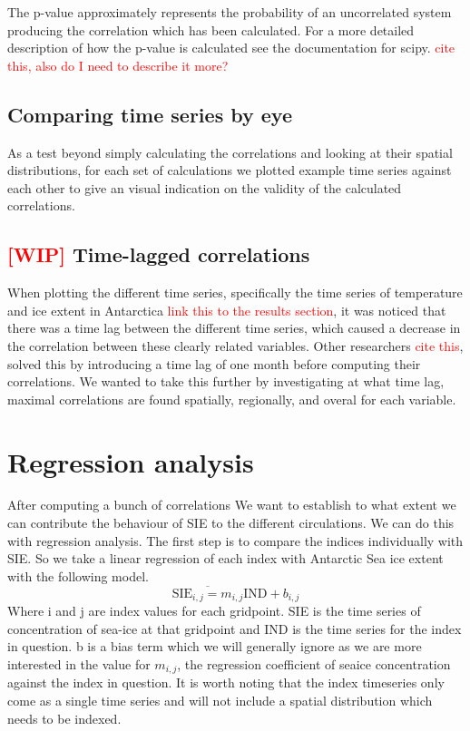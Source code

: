 \documentclass[../main.tex]{subfiles}
\begin{document}
The p-value approximately represents the probability of an uncorrelated system producing the correlation which has been calculated. For a more detailed description of how the p-value is calculated see the documentation for scipy. \textcolor{red}{cite this, also do I need to describe it more?}


\subsection{Comparing time series by eye}
As a test beyond simply calculating the correlations and looking at their spatial distributions, for each set of calculations we plotted example time series against each other to give an visual indication on the validity of the calculated correlations.


\subsection{\textcolor{red}{[WIP]} Time-lagged correlations}
When plotting the different time series, specifically the time series of temperature and ice extent in Antarctica \textcolor{red}{link this to the results section}, it was noticed that there was a time lag between the different time series, which caused a decrease in the correlation between these clearly related variables. Other researchers \textcolor{red}{cite this}, solved this by introducing a time lag of one month before computing their correlations. We wanted to take this further by investigating at what time lag, maximal correlations are found spatially, regionally, and overal for each variable.


\section{Regression analysis}
After computing a bunch of correlations We want to establish to what extent we can contribute the behaviour of SIE to the different circulations. We can do this with regression analysis. The first step is to compare the indices individually with SIE. So we take a linear regression of each index with Antarctic Sea ice extent with the following model.
$$
\overline{\text{SIE}_{i,j} = m_{i,j}}  \text{IND} + b_{i,j}
$$
Where i and j are index values for each gridpoint. SIE is the time series of concentration of sea-ice at that gridpoint and IND is the time series for the index in question. b is a bias term which we will generally ignore as we are more interested in the value for $m_{i,j}$, the regression coefficient of seaice concentration against the index in question. It is worth noting that the index timeseries only come as a single time series and will not include a spatial distribution which needs to be indexed.
\end{document}
